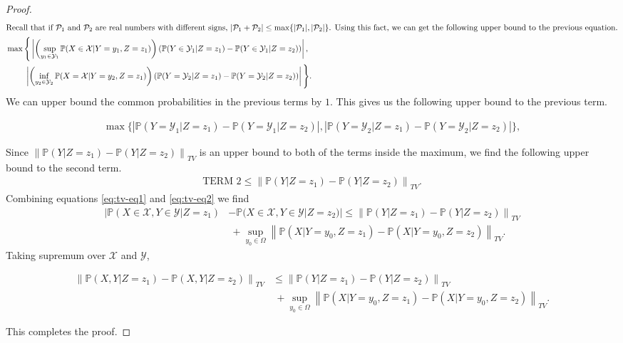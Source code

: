 \documentclass[opre,sglanonrev]{informs4}
\numberwithin{equation}{section}
\newcommand{\lp}{\left(}
\newcommand{\rp}{\right)}
\newcommand{\lv}{\left|}
\newcommand{\rv}{\right|}
\newcommand{\lV}{\left\|}
\newcommand{\rV}{\right\|}
\newcommand{\Pbb}{\mathbb{P}}
\newcommand{\Xcal}{\mathcal{X}}
\newcommand{\Ycal}{\mathcal{Y}}
\newcommand{\prob}{\Pbb}
\newcommand{\probl}{\prob}
\begin{document}
\begin{APPENDICES}
\begin{proof}
\begin{align*}
     \intertext{Recall that if $\mathcal{P}_1$ and $\mathcal{P}_2$ are real numbers with different signs, $|\mathcal{P}_1+\mathcal{P}_2|\leq \max\{|\mathcal{P}_1|,|\mathcal{P}_2|\}$. Using this fact, we can get the following upper bound to the previous equation.}
    &\max\Bigg\{\lv\lp\sup_{y_1\in\Ycal_1}\prob(X\in\Xcal|Y=y_1,Z=z_1)\rp\lp\prob(Y\in\Ycal_1|Z=z_1)-\prob(Y\in\Ycal_1|Z=z_2)\rp\rv,\\
    & \ \qquad \lv\lp\inf_{y_2\in\Ycal_2}\prob(X=\Xcal|Y=y_2,Z=z_1)\rp\lp\prob(Y=\Ycal_2|Z=z_1)-\prob(Y=\Ycal_2|Z=z_2)\rp\rv\Bigg\}.
\end{align*}
We can upper bound the common probabilities in the previous terms by $1$. This gives us the following upper bound to the previous term.
\begin{small}
\begin{align*}
    \max\bigg\{\lv\prob(Y=\Ycal_1|Z=z_1)-\prob(Y=\Ycal_1|Z=z_2)\rv,\lv\prob(Y=\Ycal_2|Z=z_1)-\prob(Y=\Ycal_2|Z=z_2)\rv\bigg\},
\end{align*}
\end{small}
Since $\lV\probl(Y|Z=z_1)-\probl(Y|Z=z_2)\rV_{TV}$ is an upper bound to both of the terms inside the maximum, we find the following upper bound to the second term.
\begin{align}\label{eq:tv-eq2}
    \text{TERM 2}\leq \lV\probl(Y|Z=z_1)-\probl(Y|Z=z_2)\rV_{TV}.
\end{align}
Combining equations \ref{eq:tv-eq1} and \ref{eq:tv-eq2} we find
\begin{align*}
    |\prob(X\in\Xcal,Y\in\Ycal|Z=z_1) & -\prob(X\in\Xcal,Y\in\Ycal|Z=z_2)|  \leq \lV\probl(Y|Z=z_1)-\probl(Y|Z=z_2)\rV_{TV}\\
    & \ + \sup_{y_0\in \Omega} \lV \probl(X|Y=y_0,Z=z_1)-\probl(X|Y=y_0,Z=z_2)\rV_{TV}.
\end{align*}
Taking supremum over $\Xcal$ and $\Ycal$,
\begin{small}
\begin{align*}
\lV\probl(X,Y|Z=z_1) -\probl(X,Y|Z=z_2)\rV_{TV}  & \leq \lV\probl(Y|Z=z_1)-\probl(Y|Z=z_2)\rV_{TV}\\
    & \ + \sup_{y_0\in \Omega} \lV \probl(X|Y=y_0,Z=z_1)-\probl(X|Y=y_0,Z=z_2)\rV_{TV}.
\end{align*}
\end{small}
This completes the proof.
\end{proof}

\end{APPENDICES}
\end{document}
